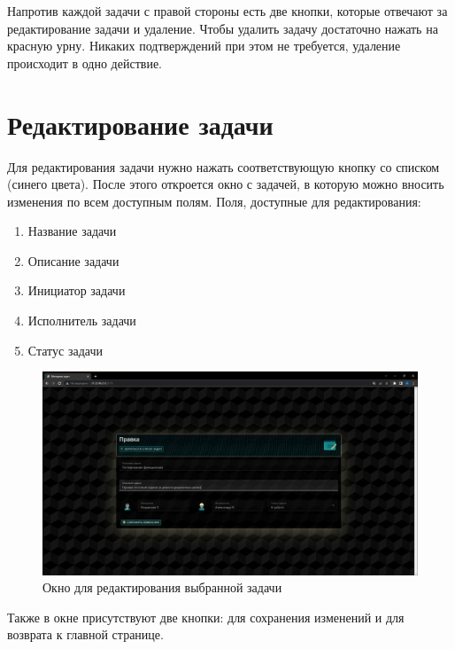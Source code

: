 \documentclass{altsu-report}
\begin{document}
Напротив каждой задачи с правой стороны есть две кнопки, которые отвечают за редактирование задачи и удаление. Чтобы удалить задачу достаточно нажать на красную урну. Никаких подтверждений при этом не требуется, удаление происходит в одно действие.

\section*{Редактирование задачи}

Для редактирования задачи нужно нажать соответствующую кнопку со списком (синего цвета). После этого откроется окно с задачей, в которую можно вносить изменения по всем доступным полям. Поля, доступные для редактирования:

\begin{enumerate}
    \item Название задачи

    \item Описание задачи

    \item Инициатор задачи

    \item Исполнитель задачи

    \item Статус задачи
\end{enumerate}

\begin{figure}[H]
    \centering
    \includegraphics[scale=0.3]{edit_task.png}
    \caption{Окно для редактирования выбранной задачи}
    \label{fig:edittask}
\end{figure}

Также в окне присутствуют две кнопки: для сохранения изменений и для возврата к главной странице.
\end{document}
